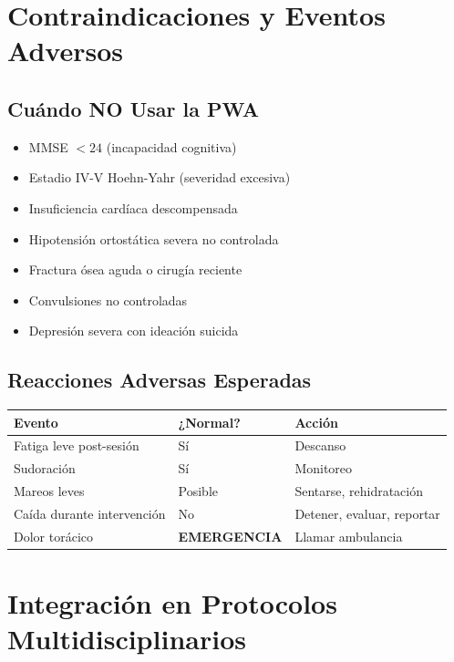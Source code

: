 \documentclass[12pt,a4paper,spanish,oneside]{book}
\begin{document}
\section{Contraindicaciones y Eventos Adversos}

\subsection{Cuándo NO Usar la PWA}

\begin{advertenciabox}
  \begin{itemize}
    \item MMSE $< 24$ (incapacidad cognitiva)
    \item Estadio IV-V Hoehn-Yahr (severidad excesiva)
    \item Insuficiencia cardíaca descompensada
    \item Hipotensión ortostática severa no controlada
    \item Fractura ósea aguda o cirugía reciente
    \item Convulsiones no controladas
    \item Depresión severa con ideación suicida
  \end{itemize}
\end{advertenciabox}

\subsection{Reacciones Adversas Esperadas}

\begin{table}[h]
  \centering
  \begin{tabular}{|p{3cm}|p{4cm}|p{4cm}|}
    \hline
    \textbf{Evento} & \textbf{¿Normal?} & \textbf{Acción} \\
    \hline
    Fatiga leve post-sesión & Sí & Descanso \\
    \hline
    Sudoración & Sí & Monitoreo \\
    \hline
    Mareos leves & Posible & Sentarse, rehidratación \\
    \hline
    Caída durante intervención & No & Detener, evaluar, reportar \\
    \hline
    Dolor torácico & \textbf{EMERGENCIA} & Llamar ambulancia \\
    \hline
  \end{tabular}
\end{table}

\section{Integración en Protocolos Multidisciplinarios}
\end{document}
